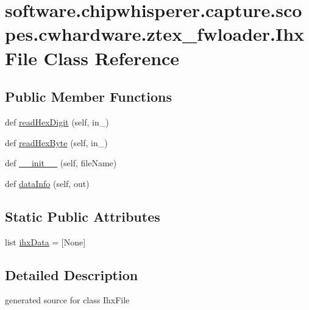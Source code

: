 \hypertarget{classsoftware_1_1chipwhisperer_1_1capture_1_1scopes_1_1cwhardware_1_1ztex__fwloader_1_1IhxFile}{}\section{software.\+chipwhisperer.\+capture.\+scopes.\+cwhardware.\+ztex\+\_\+fwloader.\+Ihx\+File Class Reference}
\label{classsoftware_1_1chipwhisperer_1_1capture_1_1scopes_1_1cwhardware_1_1ztex__fwloader_1_1IhxFile}
\subsection*{Public Member Functions}
\begin{DoxyCompactItemize}
\item 
def \hyperlink{classsoftware_1_1chipwhisperer_1_1capture_1_1scopes_1_1cwhardware_1_1ztex__fwloader_1_1IhxFile_a8b61d10ee00906b77f34dc68ca470aca}{read\+Hex\+Digit} (self, in\+\_\+)
\item 
def \hyperlink{classsoftware_1_1chipwhisperer_1_1capture_1_1scopes_1_1cwhardware_1_1ztex__fwloader_1_1IhxFile_a0c1b1623829b2bda1a2096157b1f9d81}{read\+Hex\+Byte} (self, in\+\_\+)
\item 
def \hyperlink{classsoftware_1_1chipwhisperer_1_1capture_1_1scopes_1_1cwhardware_1_1ztex__fwloader_1_1IhxFile_ad783469e55091ea4fd601d9e63aedd35}{\+\_\+\+\_\+init\+\_\+\+\_\+} (self, file\+Name)
\item 
def \hyperlink{classsoftware_1_1chipwhisperer_1_1capture_1_1scopes_1_1cwhardware_1_1ztex__fwloader_1_1IhxFile_abcf96d1df8517c107977e3b1738a8b63}{data\+Info} (self, out)
\end{DoxyCompactItemize}
\subsection*{Static Public Attributes}
\begin{DoxyCompactItemize}
\item 
list \hyperlink{classsoftware_1_1chipwhisperer_1_1capture_1_1scopes_1_1cwhardware_1_1ztex__fwloader_1_1IhxFile_ac73784252a5933c87af8f0091296db16}{ihx\+Data} = \mbox{[}None\mbox{]}
\end{DoxyCompactItemize}


\subsection{Detailed Description}
\begin{DoxyVerb}generated source for class IhxFile \end{DoxyVerb}
 

